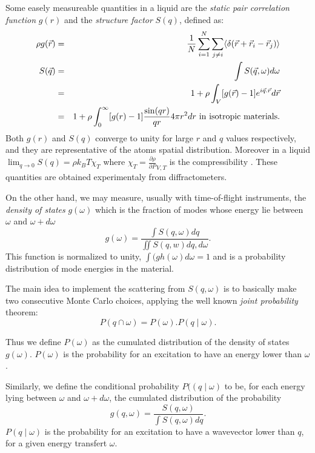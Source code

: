 Some easely measureable quantities in a liquid are the \emph{static pair correlation function} $g(r)$ and the \emph{structure factor} $S(q)$, defined as:
\begin{eqnarray}
\rho g(\vec{r}) &=& \frac{1}{N} \sum_{i=1}^N \sum_{j \neq i} \langle \delta(\vec{r}+\vec{r}_i-\vec{r}_j) \rangle \\
S(\vec{q}) &=&\int S(\vec q,\omega) d\omega \\
           &=&1 + \rho \int_V [g(\vec{r})-1] e^{i\vec{q}.\vec{r}} d\vec{r} \\
           &=&1 + \rho \int_{0}^{\infty} [g(r)-1] \frac{\sin(qr)}{qr} 4 \pi r^2 dr {\rm\ in\ isotropic\ materials.}
\end{eqnarray}
Both $g(r)$ and $S(q)$ converge to unity for large $r$ and $q$ values respectively, and they are representative of the atoms spatial distribution. Moreover in a liquid $\lim_{q \rightarrow 0} S(q) = \rho k_B T \chi_T$ where $\chi_T=\frac{\partial \rho}{\partial P}_{V,T}$ is the compressibility \cite{Egelstaff67}. These quantities are obtained experimentaly from diffractometers.

On the other hand, we may measure, usually with time-of-flight instruments, the \emph{density of states} $g(\omega)$  which is the fraction of modes whose energy lie between $\omega$ and $\omega+d\omega$ \cite{lovesey84}
\begin{equation}
g(\omega) = \frac{\int S(q,\omega) dq}{\iint S(q,w) dq, d\omega} .
\end{equation}
This function is normalized to unity, $\int (gh(\omega) d\omega = 1$ and is a probability distribution of mode energies in the material.

The main idea to implement the scattering from $S(q, \omega)$ is to basically make two consecutive Monte Carlo choices, applying the well known \emph{joint probability} theorem:
\begin{equation}
P(q \cap \omega) = P(\omega).P(q \mid \omega) .
\end{equation}

Thus we define $P(\omega)$ as the cumulated distribution of the density of states $g(\omega)$.  $P(\omega)$ is the probability for an excitation to have an energy lower than $\omega$.

Similarly, we define the conditional probability $P((q \mid \omega)$ to be, for each energy lying between $\omega$ and $\omega+d\omega$, the cumulated distribution of the probability
\begin{equation}
\hat g(q,\omega) = \frac{S(q, \omega)}{\int S(q,\omega) dq} .
\end{equation}
$P(q \mid \omega)$ is the probability for an excitation to have a wavevector lower than $q$, for a given energy transfert $\omega$.

